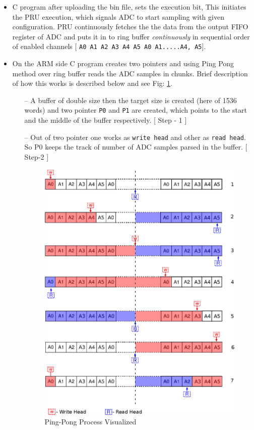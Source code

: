 \begin{itemize}
	\item C program after uploading the bin file, sets the execution bit, This initiates the PRU execution, which signals ADC to start sampling with given configuration. PRU continuously fetches the the data from the output FIFO register of ADC and puts it in to ring buffer \textit{continuously} in sequential order of enabled channels [ \texttt{A0 A1 A2 A3 A4 A5 A0 A1.....A4, A5}].
	\item On the ARM side C program creates two pointers and using Ping Pong method over ring buffer reads the ADC samples in chunks. Brief description of how this works is described below and see Fig: \ref{fig:ping_pong}.
	\begin{itemize}
		\item[--] A buffer of double size then the target size is created (here of 1536 words) and two pointer  \texttt{P0} and \texttt{P1} are created, which points to the start and the middle of the buffer respectively. [ Step - 1 ]
		\item[--] Out of two pointer one works as \texttt{write head} and other as \texttt{read head}. So P0 keeps the track of number of ADC samples parsed in the buffer. [ Step-2 ]
		
		
		\begin{figure}
			\includegraphics[width=\textwidth]{fig/ping_pong.eps}
			\caption{Ping-Pong Process Visualized}
			\label{fig:ping_pong}
		\end{figure}
		

\end{itemize}
\end{itemize}
